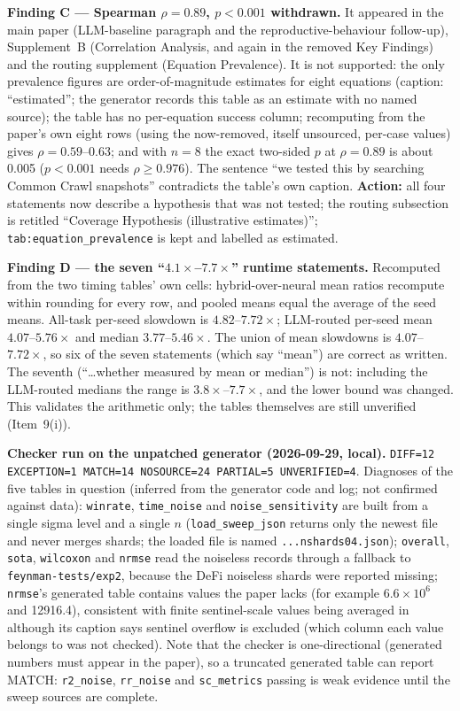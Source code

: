 \documentclass[11pt]{article}
\begin{document}
\textbf{Finding C --- Spearman $\rho=0.89$, $p<0.001$ withdrawn.} It appeared in the main paper (LLM-baseline paragraph and the
reproductive-behaviour follow-up), Supplement~B (Correlation Analysis, and again in the removed Key Findings) and the routing
supplement (Equation Prevalence). It is not supported: the only prevalence figures are order-of-magnitude estimates for eight
equations (caption: ``estimated''; the generator records this table as an estimate with no named source); the table has no
per-equation success column; recomputing from the paper's own eight rows (using the now-removed, itself unsourced, per-case
values) gives $\rho=0.59$--$0.63$; and with $n=8$ the exact two-sided $p$ at $\rho=0.89$ is about 0.005 ($p<0.001$ needs
$\rho\ge0.976$). The sentence ``we tested this by searching Common Crawl snapshots'' contradicts the table's own caption.
\textbf{Action:} all four statements now describe a hypothesis that was not tested; the routing subsection is retitled
``Coverage Hypothesis (illustrative estimates)''; \texttt{tab:equation\_prevalence} is kept and labelled as estimated.

\textbf{Finding D --- the seven ``$4.1\times$--$7.7\times$'' runtime statements.} Recomputed from the two timing tables' own cells:
hybrid-over-neural mean ratios recompute within rounding for every row, and pooled means equal the average of the seed
means. All-task per-seed slowdown is $4.82$--$7.72\times$; LLM-routed per-seed mean $4.07$--$5.76\times$ and median
$3.77$--$5.46\times$. The union of mean slowdowns is $4.07$--$7.72\times$, so six of the seven statements (which say
``mean'') are correct as written. The seventh (``\ldots whether measured by mean or median'') is not: including the LLM-routed medians the
range is $3.8\times$--$7.7\times$, and the lower bound was changed. This validates the arithmetic only; the tables themselves are
still unverified (Item~9(i)).

\textbf{Checker run on the unpatched generator (2026-09-29, local).} \texttt{DIFF=12 EXCEPTION=1 MATCH=14 NOSOURCE=24
PARTIAL=5 UNVERIFIED=4}. Diagnoses of the five tables in question (inferred from the generator code and log; not confirmed
against data): \texttt{winrate}, \texttt{time\_noise} and \texttt{noise\_sensitivity} are built from a single sigma level
and a single $n$ (\texttt{load\_sweep\_json} returns only the newest file and never merges shards; the loaded file is named
\texttt{...nshards04.json}); \texttt{overall}, \texttt{sota}, \texttt{wilcoxon} and \texttt{nrmse} read the noiseless
records through a fallback to \texttt{feynman-tests/exp2}, because the DeFi noiseless shards were reported missing; \texttt{nrmse}'s generated table
contains values the paper lacks (for example $6.6\times10^{6}$ and 12916.4), consistent with finite sentinel-scale values being averaged in although
its caption says sentinel overflow is excluded (which column each value belongs to was not checked). Note that the checker is
one-directional (generated numbers must appear in the paper), so a truncated generated table can report MATCH:
\texttt{r2\_noise}, \texttt{rr\_noise} and \texttt{sc\_metrics} passing is weak evidence until the sweep sources are complete.
\end{document}
